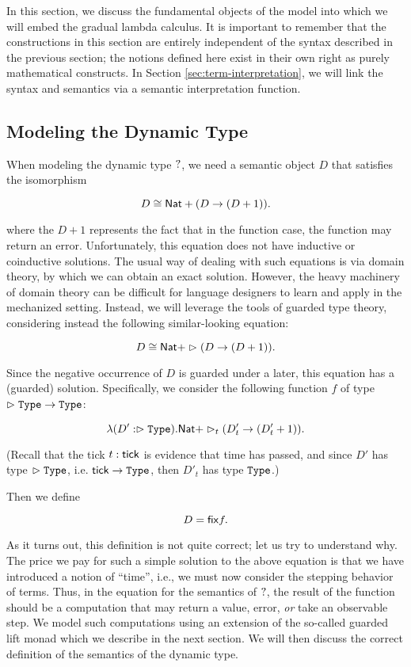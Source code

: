 In this section, we discuss the fundamental objects of the model into which we will embed
the gradual lambda calculus.
It is important to remember that the constructions in this section are entirely
independent of the syntax described in the previous section; the notions defined 
here exist in their own right as purely mathematical constructs.
In Section \ref{sec:term-interpretation}, we will link the syntax and semantics
via a semantic interpretation function.


\subsection{Modeling the Dynamic Type}

When modeling the dynamic type $?$, we need a semantic object $D$ that satisfies the
isomorphism

\[ D \cong \mathsf{Nat} + (D \to (D + 1)). \]

where the $D + 1$ represents the fact that in the function case, the function may return an error.
Unfortunately, this equation does not have inductive or coinductive solutions. The usual way of
dealing with such equations is via domain theory, by which we can obtain an exact solution.
However, the heavy machinery of domain theory can be difficult for language designers to learn
and apply in the mechanized setting.
Instead, we will leverage the tools of guarded type theory, considering instead the following
similar-looking equation:

\[ D \cong \mathsf{Nat} + \vartriangleright (D \to (D + 1)). \]

Since the negative occurrence of $D$ is guarded under a later, this equation has a (guarded) solution.
Specifically, we consider the following function $f$ of type
$\vartriangleright \texttt{Type} \to \texttt{Type}$:

\[ \lambda (D' : \vartriangleright \texttt{Type}) . \mathsf{Nat} + \vartriangleright_t (D'_t \to (D'_t + 1)). \]

(Recall that the tick $t : \mathsf{tick}$ is evidence that time has passed, and since
$D'$ has type $\vartriangleright \texttt{Type}$, i.e. $\mathsf{tick} \to \texttt{Type}$, then $D'_t$ has type $\texttt{Type}$.)

Then we define 

\[ D = \mathsf{fix} f. \]

As it turns out, this definition is not quite correct; let us try to understand why.
The price we pay for such a simple solution to the above equation is that we have
introduced a notion of ``time'', i.e., we must now consider the stepping behavior of terms.
Thus, in the equation for the semantics of $?$, the result of the function should be
a computation that may return a value, error, \emph{or} take an observable step.
We model such computations using an extension of the so-called guarded lift monad
\cite{mogelberg-paviotti2016} which we describe in the next section.
We will then discuss the correct definition of the semantics of the dynamic type.

